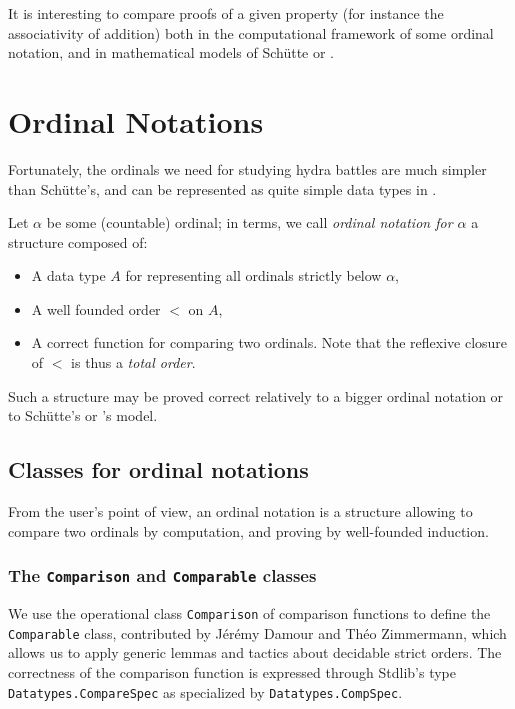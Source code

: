 
It is interesting to compare proofs of a given property (for instance the associativity of addition) both in the computational framework of some ordinal notation, and in mathematical  models
of Schütte or \gaia.

\section{Ordinal Notations}


Fortunately, the ordinals we need for  studying hydra battles are much simpler than Schütte's, and can be represented as quite simple data types in \gallina. 

Let $\alpha$ be some (countable) ordinal; 
in \coq{} terms, we call \emph{ordinal notation for $\alpha$} a structure composed 
of:
\begin{itemize}
\item A data type $A$ for representing all ordinals strictly below $\alpha$,
\item A well founded order $<$ on $A$, 
\item A correct function for comparing two ordinals. Note  that the reflexive closure of $<$ is thus a \emph{total order}.
\end{itemize}


Such a structure may be proved correct relatively to a bigger ordinal notation or to Schütte's or \gaia's model.





\subsection{Classes for ordinal notations}

From the \coq{} user's point of view, an ordinal notation is
a structure allowing to compare two ordinals by computation, and proving by well-founded induction.

\subsubsection{The \texttt{Comparison} and \texttt{Comparable} classes}

We use the operational class \texttt{Comparison} of comparison functions to define the \texttt{Comparable} class, contributed by Jérémy Damour and Théo Zimmermann, which allows us to apply generic lemmas and tactics about decidable strict orders.
The correctness of the comparison function is expressed through Stdlib's type 
\texttt{Datatypes.CompareSpec} as specialized by \texttt{Datatypes.CompSpec}.

